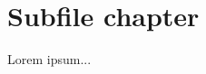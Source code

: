 \documentclass[main.tex]{subfiles}
\begin{document}
\chapter{Subfile chapter}
Lorem ipsum...
\end{document}
